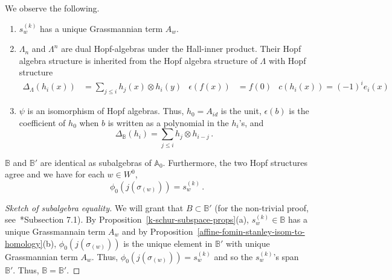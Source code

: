 \documentclass[11pt,leqno,oneside]{amsart}
\numberwithin{thm}{section}
\newcommand{\A}{\mathbb{A}}
\newcommand{\B}{\mathbb{B}}
\newcommand{\sym}{\Lambda}
\begin{document}
\begin{prop}\label{k-schur-subspace-props}
  We observe the following.
  \begin{enumerate}
  \item \(s_w^{(k)}\) has a unique Grassmannian term \(A_w\).
  \item \(\sym_n\) and \(\sym^n\) are dual Hopf-algebras under the
    Hall-inner product. Their Hopf algebra structure is inherited from
    the Hopf algebra structure of \(\sym\) with Hopf structure
    \begin{align*}
      \Delta_{\sym}(h_i(x)) & = \sum_{j \leq i} h_j(x) \otimes h_i(y)
      & \epsilon(f(x)) & = f(0) & c(h_i(x)) = (-1)^i e_i(x)
    \end{align*}
  \item \(\psi\) is an isomorphism of Hopf algebras. Thus, \(h_0 =
    A_{id}\) is the unit, \(\epsilon(b)\) is the coefficient of
    \(h_0\) when \(b\) is written as a polynomial in the \(h_i\)'s,
    and \[
      \Delta_\B(h_i) = \sum_{j \leq i} h_j \otimes h_{i-j} \,.
    \]
  \end{enumerate}
\end{prop}
\begin{thm}\label{affine-fomin-stanley-equal}
  \(\B\) and \(\B'\) are identical as subalgebras of
  \(\A_0\). Furthermore, the two Hopf structures agree and we have for
  each \(w \in W^0\), \[
    \phi_0(j(\sigma_{(w)})) = s_w^{(k)} \,.
  \]
\end{thm}
\begin{proof}[Sketch of subalgebra equality]
  We will grant that \(B \subset \B'\) (for the non-trivial proof,
  see~\cite{lam}*{Subsection
    7.1}). By Proposition~\ref{k-schur-subspace-props}(a), \(s_w^{(k)} \in \B\)
  has a 
  unique Grassmannain term \(A_w\) and by
  Proposition~\ref{affine-fomin-stanley-isom-to-homology}(b), 
  \(\phi_0(j(\sigma_{(w)}))\) is the unique element in \(\B'\) with
  unique Grassmannian term \(A_w\). Thus, \(\phi_0(j(\sigma_{(w)})) =
  s_w^{(k)}\) and so the \(s_w^{(k)}\)'s span \(\B'\). Thus, \(\B = \B'\).
\end{proof}
\end{document}
